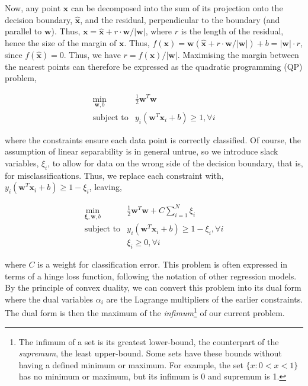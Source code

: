 \documentclass[11pt]{amsart}
\begin{document}
Now, any point $\mathbf{x}$ can be decomposed into the sum of its projection onto the decision boundary, $\hat{\mathbf{x}}$, and the residual, perpendicular to the boundary (and parallel to $\mathbf{w}$). Thus, $\mathbf{x} = \hat{\mathbf{x}} + r\cdot\mathbf{w}/|\mathbf{w}|$, where $r$ is the length of the residual, hence the size of the margin of $\mathbf{x}$. Thus, $f(\mathbf{x}) = \mathbf{w}(\hat{\mathbf{x}} + r\cdot\mathbf{w}/|\mathbf{w}|) + b =  |\mathbf{w}|\cdot r$, since $f(\hat{\mathbf{x}}) = 0$. Thus, we have $r = f(\mathbf{x})/|\mathbf{w}|$. Maximising the margin between the nearest points can therefore be expressed as the quadratic programming (QP) problem,

$$
\begin{array}{rl}
\min_{\mathbf{w}, b} & \frac{1}{2}\mathbf{w}^T\mathbf{w} \\
\text{subject to} & y_i(\mathbf{w}^T\mathbf{x}_i + b) \geq 1, \forall i
\end{array}
$$

where the constraints ensure each data point is correctly classified. Of course, the assumption of linear separability is in general untrue, so we introduce slack variables, $\xi_i$, to allow for data on the wrong side of the decision boundary, that is, for misclassifications. Thus, we replace each constraint with, $y_i(\mathbf{w}^T\mathbf{x}_i + b) \geq 1 - \xi_i$, leaving,

$$
\begin{array}{rl}
\min_{\boldsymbol\xi, \mathbf{w}, b} & \frac{1}{2}\mathbf{w}^T\mathbf{w} + C\sum_{i = 1}^{N}\xi_i \\
\text{subject to} & y_i(\mathbf{w}^T\mathbf{x}_i + b) \geq 1 - \xi_i, \forall i \\
& \xi_i \geq 0, \forall i
\end{array}
$$

where $C$ is a weight for classification error. This problem is often expressed in terms of a hinge loss function, following the notation of other regression models. By the principle of convex duality, we can convert this problem into its dual form where the dual variables $\alpha_i$ are the Lagrange multipliers of the earlier constraints. The dual form is then the maximum of the \emph{infimum}\footnote{The infimum of a set is its greatest lower-bound, the counterpart of the \emph{supremum}, the least upper-bound. Some sets have these bounds without having a defined minimum or maximum. For example, the set $\{x : 0 < x < 1\}$ has no minimum or maximum, but its infimum is 0 and supremum is 1.}  of our current problem.
\end{document}

